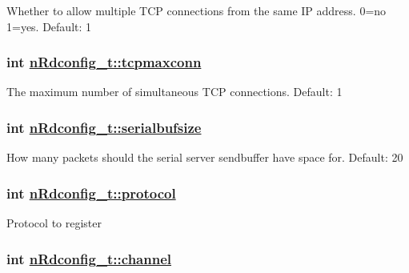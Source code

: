 Whether to allow multiple TCP connections from the same IP address. 0=no 1=yes. Default: 1 \hypertarget{structnRdconfig__t_76150067cf1ce716265a738d93e46c75}{
\subsubsection[tcpmaxconn]{\setlength{\rightskip}{0pt plus 5cm}int \hyperlink{structnRdconfig__t_76150067cf1ce716265a738d93e46c75}{n\-Rdconfig\_\-t::tcpmaxconn}}}
\label{structnRdconfig__t_76150067cf1ce716265a738d93e46c75}


The maximum number of simultaneous TCP connections. Default: 1 \hypertarget{structnRdconfig__t_fbda9271df1df01f8670ec718d3b73d3}{
\subsubsection[serialbufsize]{\setlength{\rightskip}{0pt plus 5cm}int \hyperlink{structnRdconfig__t_fbda9271df1df01f8670ec718d3b73d3}{n\-Rdconfig\_\-t::serialbufsize}}}
\label{structnRdconfig__t_fbda9271df1df01f8670ec718d3b73d3}


How many packets should the serial server sendbuffer have space for. Default: 20 \hypertarget{structnRdconfig__t_69ce236d67271ff0a4c579ab2a9a0698}{
\subsubsection[protocol]{\setlength{\rightskip}{0pt plus 5cm}int \hyperlink{structnRdconfig__t_69ce236d67271ff0a4c579ab2a9a0698}{n\-Rdconfig\_\-t::protocol}}}
\label{structnRdconfig__t_69ce236d67271ff0a4c579ab2a9a0698}


Protocol to register \hypertarget{structnRdconfig__t_888c547a8689e5f5123862381276c21b}{
\subsubsection[channel]{\setlength{\rightskip}{0pt plus 5cm}int \hyperlink{structnRdconfig__t_888c547a8689e5f5123862381276c21b}{n\-Rdconfig\_\-t::channel}}}
\label{structnRdconfig__t_888c547a8689e5f5123862381276c21b}


